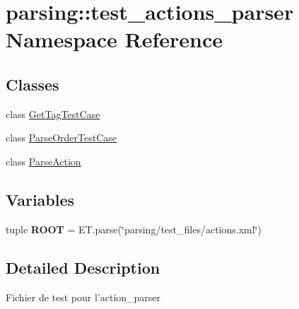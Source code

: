 \hypertarget{namespaceparsing_1_1test__actions__parser}{\section{parsing\-:\-:test\-\_\-actions\-\_\-parser \-Namespace \-Reference}
\label{namespaceparsing_1_1test__actions__parser}
}
\subsection*{\-Classes}
\begin{DoxyCompactItemize}
\item 
class \hyperlink{classparsing_1_1test__actions__parser_1_1_get_tag_test_case}{\-Get\-Tag\-Test\-Case}
\item 
class \hyperlink{classparsing_1_1test__actions__parser_1_1_parse_order_test_case}{\-Parse\-Order\-Test\-Case}
\item 
class \hyperlink{classparsing_1_1test__actions__parser_1_1_parse_action}{\-Parse\-Action}
\end{DoxyCompactItemize}
\subsection*{\-Variables}
\begin{DoxyCompactItemize}
\item 
\hypertarget{namespaceparsing_1_1test__actions__parser_ace768b641def31f479091f47ac18e0aa}{tuple {\bfseries \-R\-O\-O\-T} = \-E\-T.\-parse(\char`\"{}parsing/test\-\_\-files/actions.\-xml\char`\"{})}\label{namespaceparsing_1_1test__actions__parser_ace768b641def31f479091f47ac18e0aa}

\end{DoxyCompactItemize}


\subsection{\-Detailed \-Description}
\begin{DoxyVerb}
Fichier de test pour l'action_parser
\end{DoxyVerb}
 